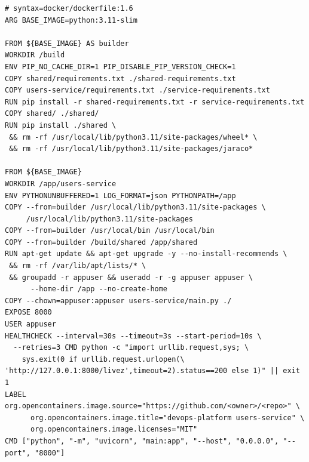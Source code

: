 \documentclass[12pt,a4paper]{article}
\begin{document}
\begin{lstlisting}[caption={app/users-service/Dockerfile --- complet}]
# syntax=docker/dockerfile:1.6
ARG BASE_IMAGE=python:3.11-slim

FROM ${BASE_IMAGE} AS builder
WORKDIR /build
ENV PIP_NO_CACHE_DIR=1 PIP_DISABLE_PIP_VERSION_CHECK=1
COPY shared/requirements.txt ./shared-requirements.txt
COPY users-service/requirements.txt ./service-requirements.txt
RUN pip install -r shared-requirements.txt -r service-requirements.txt
COPY shared/ ./shared/
RUN pip install ./shared \
 && rm -rf /usr/local/lib/python3.11/site-packages/wheel* \
 && rm -rf /usr/local/lib/python3.11/site-packages/jaraco*

FROM ${BASE_IMAGE}
WORKDIR /app/users-service
ENV PYTHONUNBUFFERED=1 LOG_FORMAT=json PYTHONPATH=/app
COPY --from=builder /usr/local/lib/python3.11/site-packages \
     /usr/local/lib/python3.11/site-packages
COPY --from=builder /usr/local/bin /usr/local/bin
COPY --from=builder /build/shared /app/shared
RUN apt-get update && apt-get upgrade -y --no-install-recommends \
 && rm -rf /var/lib/apt/lists/* \
 && groupadd -r appuser && useradd -r -g appuser appuser \
      --home-dir /app --no-create-home
COPY --chown=appuser:appuser users-service/main.py ./
EXPOSE 8000
USER appuser
HEALTHCHECK --interval=30s --timeout=3s --start-period=10s \
  --retries=3 CMD python -c "import urllib.request,sys; \
    sys.exit(0 if urllib.request.urlopen(\
'http://127.0.0.1:8000/livez',timeout=2).status==200 else 1)" || exit 1
LABEL org.opencontainers.image.source="https://github.com/<owner>/<repo>" \
      org.opencontainers.image.title="devops-platform users-service" \
      org.opencontainers.image.licenses="MIT"
CMD ["python", "-m", "uvicorn", "main:app", "--host", "0.0.0.0", "--port", "8000"]
\end{lstlisting}
\end{document}
